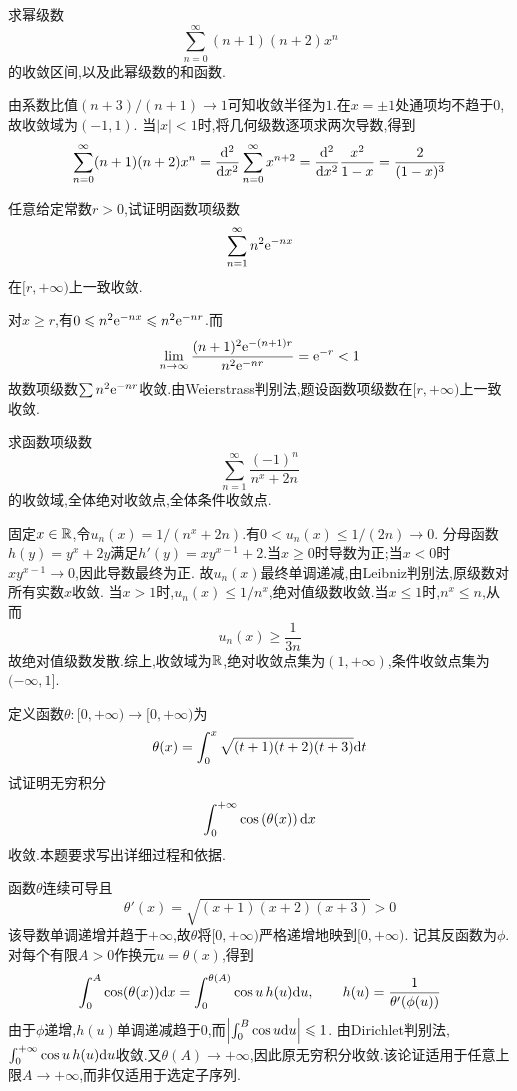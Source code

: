 \documentclass{ctexart}
\begin{document}
\begin{problem}[4.(10\songti{分})]
求幂级数
        \[\sum_{n=0}^{\infty}(n+1)(n+2)x^n\]
        的收敛区间,以及此幂级数的和函数.
\end{problem}
\begin{solution}
由系数比值$(n+3)/(n+1)\to1$可知收敛半径为$1$.在$x=\pm1$处通项均不趋于$0$,故收敛域为$(-1,1)$.
当$|x|<1$时,将几何级数逐项求两次导数,得到
\[\sum_{n=0}^{\infty}(n+1)(n+2)x^n
=\frac{\mathrm{d}^2}{\mathrm{d} x^2}\sum_{n=0}^{\infty}x^{n+2}
=\frac{\mathrm{d}^2}{\mathrm{d} x^2}\frac{x^2}{1-x}=\frac2{(1-x)^3}\]
\end{solution}

\begin{problem}[5.(10\songti{分})]
任意给定常数$r>0$,试证明函数项级数
        \[\sum_{n=1}^\infty n^2\mathrm{e}^{-nx}\]
        在$[r,+\infty)$上一致收敛.
\end{problem}
\begin{solution}
对$x\geqslant r$,有$0\leqslant n^2\mathrm{e}^{-nx}\leqslant n^2\mathrm{e}^{-nr}$.而
\[\lim_{n\to\infty}\frac{(n+1)^2\mathrm{e}^{-(n+1)r}}{n^2\mathrm{e}^{-nr}}=\mathrm{e}^{-r}<1\]
故数项级数$\sum n^2\mathrm{e}^{-nr}$收敛.由Weierstrass判别法,题设函数项级数在$[r,+\infty)$上一致收敛.
\end{solution}

\begin{problem}[6.(15\songti{分})]
求函数项级数
        \[\sum_{n=1}^\infty\dfrac{(-1)^n}{n^x+2n}\]
        的收敛域,全体绝对收敛点,全体条件收敛点.
\end{problem}
\begin{solution}
固定$x\in\mathbb{R}$,令$u_n(x)=1/(n^x+2n)$.有$0<u_n(x)\leqslant1/(2n)\to0$.
分母函数$h(y)=y^x+2y$满足$h'(y)=xy^{x-1}+2$.当$x\geqslant0$时导数为正;当$x<0$时$xy^{x-1}\to0$,因此导数最终为正.
故$u_n(x)$最终单调递减,由Leibniz判别法,原级数对所有实数$x$收敛.
当$x>1$时,$u_n(x)\leqslant1/n^x$,绝对值级数收敛.当$x\leqslant1$时,$n^x\leqslant n$,从而
\[u_n(x)\geqslant\frac1{3n}\]
故绝对值级数发散.综上,收敛域为$\mathbb{R}$,绝对收敛点集为$(1,+\infty)$,条件收敛点集为$(-\infty,1]$.
\end{solution}

\begin{problem}[7.(15\songti{分})]
定义函数$\theta:[0,+\infty)\to[0,+\infty)$为
        \[\theta(x)=\int_0^x\sqrt{(t+1)(t+2)(t+3)}\mathrm{d} t\]
        试证明无穷积分
        \[\int_0^{+\infty}\cos\left(\theta(x)\right)\mathrm{d} x\]
        收敛.本题要求写出详细过程和依据.
\end{problem}
\begin{solution}
函数$\theta$连续可导且
\[\theta'(x)=\sqrt{(x+1)(x+2)(x+3)}>0\]
该导数单调递增并趋于$+\infty$,故$\theta$将$[0,+\infty)$严格递增地映到$[0,+\infty)$.
记其反函数为$\phi$.对每个有限$A>0$作换元$u=\theta(x)$,得到
\[\int_0^A\cos(\theta(x))\mathrm{d} x
=\int_0^{\theta(A)}\cos u\,h(u)\mathrm{d} u,\qquad
h(u)=\frac1{\theta'(\phi(u))}\]
由于$\phi$递增,$h(u)$单调递减趋于$0$,而$\left|\int_0^B\cos u\mathrm{d} u\right|\leqslant1$.
由Dirichlet判别法,$\int_0^{+\infty}\cos u\,h(u)\mathrm{d} u$收敛.又$\theta(A)\to+\infty$,因此原无穷积分收敛.该论证适用于任意上限$A\to+\infty$,而非仅适用于选定子序列.
\end{solution}
\end{document}
